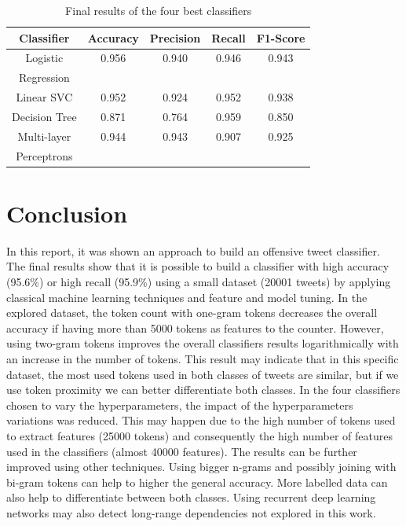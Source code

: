\documentclass[journal]{IEEEtran}
\begin{document}
\begin{table}
\caption{Final results of the four best classifiers}
\begin{center}
 \begin{tabular}{||c c c c c||} 
 \hline
 Classifier & Accuracy & Precision & Recall & F1-Score \\ [0.5ex] 
 \hline\hline
 Logistic & 0.956 & 0.940 & 0.946 & 0.943 \\ 
 Regression & & & & \\
 \hline
 Linear SVC & 0.952 & 0.924 & 0.952 & 0.938 \\
 \hline
 Decision Tree & 0.871 & 0.764 & 0.959 & 0.850 \\
 \hline
 Multi-layer & 0.944 & 0.943 & 0.907 & 0.925 \\
 Perceptrons & & & & \\
 \hline
\end{tabular}
\end{center}
\label{table:finalresults}
\end{table}

\section{Conclusion}
In this report, it was shown an approach to build an offensive tweet classifier. The final results show that it is possible to build a classifier with high accuracy (95.6\%) or high recall (95.9\%) using a small dataset (20001 tweets) by applying classical machine learning techniques and feature and model tuning.
In the explored dataset, the token count with one-gram tokens decreases the overall accuracy if having more than 5000 tokens as features to the counter. However, using two-gram tokens improves the overall classifiers results logarithmically with an increase in the number of tokens. This result may indicate that in this specific dataset, the most used tokens used in both classes of tweets are similar, but if we use token proximity we can better differentiate both classes.
In the four classifiers chosen to vary the hyperparameters, the impact of the hyperparameters variations was reduced. This may happen due to the high number of tokens used to extract features (25000 tokens) and consequently the high number of features used in the classifiers (almost 40000 features).
The results can be further improved using other techniques. Using bigger n-grams and possibly joining with bi-gram tokens can help to higher the general accuracy. More labelled data can also help to differentiate between both classes. Using recurrent deep learning networks may also detect long-range dependencies not explored in this work.
\end{document}
